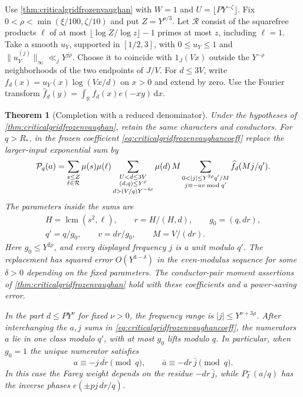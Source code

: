 \documentclass[11pt,a4paper]{article}
\numberwithin{equation}{section}
\newtheorem{theorem}{Theorem}[section]
\newcommand{\ud}{\mathrm d}
\begin{document}
Use \cref{thm:criticalgridfrozenvaughan} with $W=1$
and $U=\lfloor P Y^{-\zeta}\rfloor$. Fix
$0<\rho<\min(\xi/100,\zeta/10)$ and put $Z=Y^{\rho/3}$.
Let $\mathcal R$ consist of the squarefree products $\ell$
of at most $\lfloor\log Z/\log z\rfloor-1$ primes at most
$z$, including $\ell=1$. Take a smooth $u_Y$, supported in
$[1/2,3]$, with $0\le u_Y\le1$ and
$\|u_Y^{(j)}\|_\infty\ll_j Y^{j\rho}$. Choose it to coincide
with $1_J(Vx)$ outside the $Y^{-\rho}$ neighborhoods of
the two endpoints of $J/V$. For $d\le3V$, write
$f_d(x)=u_Y(x)\log(Vx/d)$ on $x>0$ and extend by zero.
Use the Fourier transform
$\widehat f_d(y)=\int_{\mathbb R} f_d(x)e(-xy)\,\ud x$.

\begin{theorem}[Completion with a reduced denominator]
\label{thm:criticalgridpoisson}
Under the hypotheses of \cref{thm:criticalgridfrozenvaughan},
retain the same characters and conductors. For $q>R_*$, in
the frozen coefficient \cref{eq:criticalgridfrozenvaughancoeff}
replace the larger-input exponential sum by
\begin{align}
 {\cal P}_q(a)
  =\sum_{\substack{s\le Z\\\ell\in\mathcal R}}\mu(s)\mu(\ell)
    \sum_{\substack{U<d\le3V\\(d,q)\le Y^\rho\\d>(V/q)Y^{-4\rho}}}
       \mu(d)\,M
    \sum_{\substack{0<|j|\le Y^{2\rho}q'/M\\
                        j\equiv-av\bmod q'}}
                   \widehat f_d(Mj/q').
 \label{eq:criticalgridpoisson}
\end{align}
The parameters inside the sums are
\begin{equation}
 \begin{gathered}
 H=\operatorname{lcm}(s^2,\ell),\qquad r=H/(H,d),\qquad
 g_0=(q,dr),\\
 q'=q/g_0,\qquad v=dr/g_0,\qquad M=V/(dr).
 \end{gathered}
 \label{eq:criticalgridpoissonparameters}
\end{equation}
Here $g_0\le Y^{2\rho}$, and every displayed frequency $j$
is a unit modulo $q'$. The replacement has squared error
$O(Y^{3-\delta})$ in the even-modulus sequence for some
$\delta>0$ depending on the fixed parameters. The
conductor-pair moment assertions of
\cref{thm:criticalgridfrozenvaughan} hold with these
coefficients and a power-saving error.

In the part $d\le P Y^\nu$ for fixed $\nu>0$, the frequency
range is $|j|\le Y^{\nu+3\rho}$. After interchanging the
$a,j$ sums in \cref{eq:criticalgridfrozenvaughancoeff}, the
numerators $a$ lie in one class modulo $q'$, with at most
$g_0$ lifts modulo $q$. In particular, when $g_0=1$ the
unique numerator satisfies
\begin{equation}
 a\equiv-j\,\overline{dr}\pmod q,\qquad
 \bar a\equiv-dr\,\bar j\pmod q.
 \label{eq:criticalgridpoissoninverse}
\end{equation}
In this case the Farey weight depends on the residue
$-dr\,\bar j$, while $P_I^-(a/q)$ has the inverse phases
$e(\pm p j\,\overline{dr}/q)$.


\end{theorem}
\end{document}
